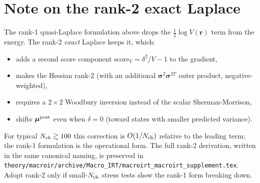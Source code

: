 \documentclass[11pt]{article}
\begin{document}
\section{Note on the rank-2 exact Laplace}

The rank-1 quasi-Laplace formulation above drops the $\tfrac12\log V(\mathbf{r})$
term from the energy. The rank-2 \emph{exact} Laplace keeps it, which:
\begin{itemize}
  \item adds a second score component
        $\mathrm{score}_V = \delta^2/V - 1$ to the gradient,
  \item makes the Hessian rank-2 (with an additional
        $\boldsymbol{\sigma}^2\boldsymbol{\sigma}^{2T}$ outer product, negative-weighted),
  \item requires a $2\!\times\! 2$ Woodbury inversion instead of the scalar
        Sherman-Morrison,
  \item shifts $\boldsymbol{\mu}^{\mathrm{post}}$ even when $\delta=0$ (toward states with smaller
        predicted variance).
\end{itemize}
For typical $N_{\mathrm{ch}}\gtrsim 100$ this correction is $O(1/N_{\mathrm{ch}})$ relative to
the leading term; the rank-1 formulation is the operational form. The full
rank-2 derivation, written in the same canonical naming, is preserved in
\texttt{theory/macroir/archive/Macro\_IRT/macroirt\_macroirt\_supplement.tex}.
Adopt rank-2 only if small-$N_{\mathrm{ch}}$ stress tests show the rank-1 form
breaking down.
\end{document}
